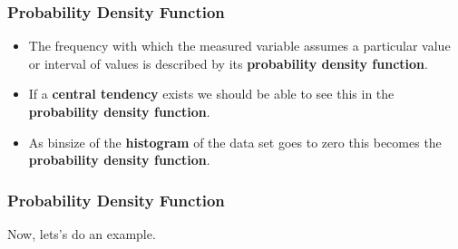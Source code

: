 \documentclass[fleqn]{beamer} %
\newcommand{\sectiontitleIV}{Probability Density Function}
\begin{document}
	\begin{frame}[label=sectionIV] \small
		\frametitle{\sectiontitleIV}    

			\begin{itemize}
			\item  The frequency with which the measured variable assumes a particular value or interval of values is described by its {\bf \BL probability density function}. \\

            \item  If a {\bf \PR central tendency} exists we should be able to see this in the {\bf \BL probability density function}. \\
                               
            \item  As binsize of the {\bf \GR histogram} of the data set goes to zero this becomes the {\bf \BL probability density function}. \\ 
                                
		\end{itemize}

	\end{frame}

	\begin{frame}[label=sectionIV] \small
		\frametitle{\sectiontitleIV}    
Now, lets's do an example.

	\end{frame}
\end{document}
